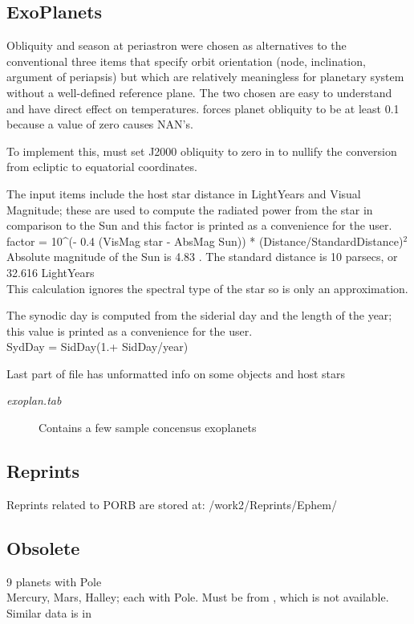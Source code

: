 \documentclass[draft]{article}
\begin{document}
\subsection {ExoPlanets}

Obliquity and season at periastron were chosen as alternatives to the
conventional three items that specify orbit orientation (node, inclination,
argument of periapsis) but which are relatively meaningless for planetary system
without a well-defined reference plane.  The two chosen are easy to understand
and have direct effect on temperatures.   forces planet obliquity to
be at least 0.1\qd~ because a value of zero causes NAN's.

To implement this, must set J2000 obliquity  to zero in  to nullify the conversion from ecliptic to equatorial coordinates. 

The input items include the host star distance in LightYears and Visual Magnitude;  these are used to compute the radiated power from the star in comparison to the Sun and this factor is printed as a convenience for the user.
\\ factor = 10\^{ }(- 0.4 (VisMag star - AbsMag Sun)) * (Distance/StandardDistance)$^2$ 
\qi Absolute magnitude of the Sun is 4.83 . The standard distance is 10 parsecs, or 32.616 LightYears
\\ This calculation ignores the spectral type of the star so is only an approximation.

\vspace{3.mm}
The synodic day is computed from the siderial day and the length of the year; this value is printed as a convenience for the user.
\\ SydDay = SidDay(1.+ SidDay/year)

Last part of file has unformatted info on some objects and host stars

\begin{description} 
 \item [\textit{exoplan.tab}] Contains a few sample concensus exoplanets
\end{description}

\subsection{Reprints}

Reprints related to PORB are stored at: /work2/Reprints/Ephem/

\subsection{Obsolete}
    \cite{Seidelmann74} 9 planets with Pole
\\  Mercury, Mars, Halley; each with Pole. Must be from \cite{Sturms71}, which is not available. Similar data is in \cite{Melbourne68}
\end{document}
